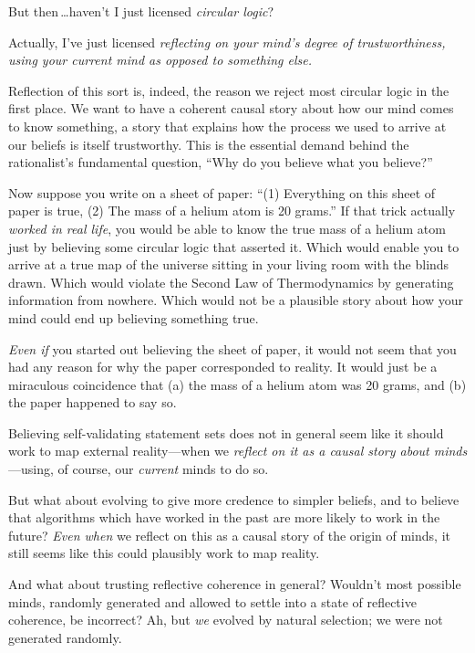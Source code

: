  But then\,\ldots haven't I just licensed
\textit{circular logic}?

{
 Actually, I've just licensed \textit{reflecting on
your mind's degree of trustworthiness, using your
current mind as opposed to something else.}}


 Reflection of this sort is, indeed, the reason we reject most
circular logic in the first place. We want to have a coherent causal
story about how our mind comes to know something, a story that explains
how the process we used to arrive at our beliefs is itself trustworthy.
This is the essential demand behind the rationalist's
fundamental question, ``Why do you believe what you
believe?''


 Now suppose you write on a sheet of paper: ``(1)
Everything on this sheet of paper is true, (2) The mass of a helium
atom is 20 grams.'' If that trick actually
\textit{worked in real life}, you would be able to know the true mass
of a helium atom just by believing some circular logic that asserted
it. Which would enable you to arrive at a true map of the universe
sitting in your living room with the blinds drawn. Which would violate
the Second Law of Thermodynamics by generating information from
nowhere. Which would not be a plausible story about how your mind could
end up believing something true.


 \textit{Even if} you started out believing the sheet of paper, it
would not seem that you had any reason for why the paper corresponded
to reality. It would just be a miraculous coincidence that (a) the mass
of a helium atom was 20 grams, and (b) the paper happened to say so.


 Believing self-validating statement sets does not in general seem
like it should work to map external reality---when we \textit{reflect
on it as a causal story about minds}{}---using, of course, our
\textit{current} minds to do so.


 But what about evolving to give more credence to simpler beliefs,
and to believe that algorithms which have worked in the past are more
likely to work in the future? \textit{Even when} we reflect on this as
a causal story of the origin of minds, it still seems like this could
plausibly work to map reality.


 And what about trusting reflective coherence in general?
Wouldn't most possible minds, randomly generated and
allowed to settle into a state of reflective coherence, be incorrect?
Ah, but \textit{we} evolved by natural selection; we were not generated
randomly.


